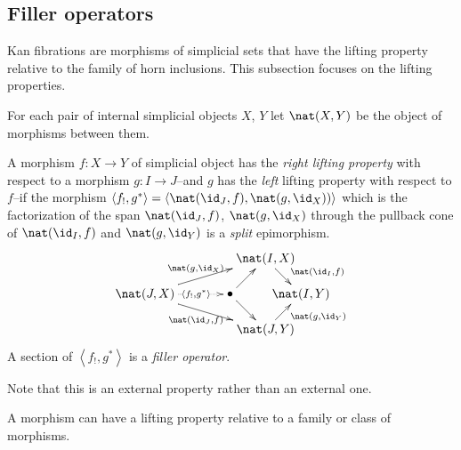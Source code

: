 \documentclass{tac}
\newcommand\hide[1]{}
\newcommand\ri{^*}
\newcommand\bang{!}
\newcommand\of{:}
\newcommand\tuplet[1]{\left\langle #1 \right\rangle}
\begin{document}
\subsection{Filler operators} %
Kan fibrations are morphisms of simplicial sets that have the lifting property relative to the family of horn inclusions. This subsection focuses on the lifting properties.

\hide{
When dealing with projectives, the properties 'there is a lifting' and having a lifting operator coincide.

We just need to be careful about non projective simplicial objects--these newbies may have unexpected properties.

Check when being projective plays a role.
}

\begin{definition} For each pair of internal simplicial objects $X$, $Y$ let $\nat(X,Y)$ be the object of morphisms between them.

A morphism $f\of X\to Y$ of simplicial object has the \emph{right lifting property} with respect to a morphism $g\of I\to J$--and $g$ has the \emph{left} lifting property with respect to $f$--if the morphism $\tuplet{f_!,g\ri} = \tuplet{\nat(\id_J,f),\nat(g,\id_X))}$ 
which is the factorization of the span $\nat(\id_J,f)$, $\nat(g,\id_X)$ through the pullback cone of $\nat(\id_I,f)$ and $\nat(g,\id_Y)$
is a \emph{split} epimorphism.
\[\xy
(34,20)*+{\nat(I,X)}="top",(0,10)*+{\nat(J,X)}="left",(24,10)*+{\bullet}="middle",(44,10)*+{\nat(I,Y)}="right",(34,0)*+{\nat(J,Y)}="bottom"
\ar^{\nat(g,\id_X)} "left";"top" \ar@{.>}|(.6){\tuplet{f_!,g\ri}} "left";"middle" \ar_{\nat(\id_J,f)} "left";"bottom" \ar "middle";"bottom"
\ar "middle";"top" \ar^(.6){\nat(\id_I,f)} "top";"right" \ar_(.6){\nat(g,\id_Y)} "bottom";"right"
\endxy\]
A section of $\tuplet{f_\bang,g\ri}$ is a \emph{filler operator}.\label{lifting}
\end{definition}

Note that this is an external property rather than an external one.

\hide{explain why %
\begin{lemma} If $X$ and $Y$ are projective, then so is $\nat(X,Y)$. \end{lemma}

\begin{proof} The object $\nat(X,Y)$ is a subobject of the fibred exponential $Y^X_\nno$ that is defined by a system of equations. Projectives are closed under all required constructions.
\end{proof}
}
A morphism can have a lifting property relative to a family or class of morphisms.
\end{document}
